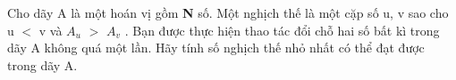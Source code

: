 Cho dãy A là một hoán vị gồm \textbf{ N } số. Một nghịch thế là một cặp số u, v sao cho u $<$ v và $A_{u}$ $>$ $A_{v}$ . Bạn được thực hiện thao tác đổi chỗ hai số bất kì trong dãy A không quá một lần. Hãy tính số nghịch thế nhỏ nhất có thể đạt được trong dãy A.